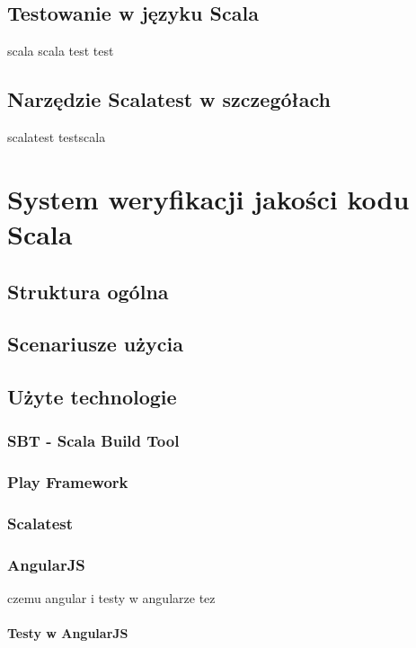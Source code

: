 \documentclass[brudnopis]{xmgr}
\begin{document}
\section{Testowanie w języku Scala}

scala scala test test 
      
\section{Narzędzie Scalatest w szczegółach}

scalatest testscala

\chapter{System weryfikacji jakości kodu Scala}

\section{Struktura ogólna}

\section{Scenariusze użycia}

\section{Użyte technologie}

\subsection{SBT - Scala Build Tool}

\subsection{Play Framework}

\subsection{Scalatest}

\subsection{AngularJS}

czemu angular i testy w angularze tez

\subsubsection{Testy w AngularJS}
\end{document}

